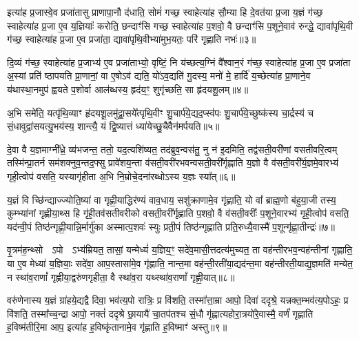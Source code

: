 इत्या॑ह प्र॒जास्वे॒व प्रजा॑तासु प्राणापा॒नौ द॑धाति॒ सोमं॑ गच्छ॒ स्वाहेत्या॑ह सौ॒म्या हि दे॒वत॑या प्र॒जा य॒ज्ञं ग॑च्छ॒ स्वाहेत्या॑ह प्र॒जा ए॒व य॒ज्ञियाः᳚ करोति॒ छन्दाꣳ॑सि गच्छ॒ स्वाहेत्या॑ह प॒शवो॒ वै छन्दाꣳ॑सि प॒शूने॒वाव॑ रुन्द्धे॒ द्यावा॑पृथि॒वी ग॑च्छ॒ स्वाहेत्या॑ह प्र॒जा ए॒व प्रजा॑ता॒ द्यावा॑पृथि॒वीभ्या॑मुभ॒यतः॒ परि॑ गृह्णाति नभः॑॥३॥

दि॒व्यं ग॑च्छ॒ स्वाहेत्या॑ह प्र॒जाभ्य॑ ए॒व प्रजा॑ताभ्यो॒ वृष्टिं॒ नि य॑च्छत्य॒ग्निं वै᳚श्वान॒रं ग॑च्छ॒ स्वाहेत्या॑ह प्र॒जा ए॒व प्रजा॑ता अ॒स्यां प्रति॑ ष्ठापयति प्रा॒णानां॒ वा ए॒षो\-ऽव॑ द्यति॒ यो॑\-ऽव॒द्यति॑ गु॒दस्य॒ मनो॑ मे॒ हार्दि॑ य॒च्छेत्या॑ह प्रा॒णाने॒व य॑थास्था॒नमुप॑ ह्वयते प॒शोर्वा आल॑ब्धस्य॒ हृद॑य॒ꣳ॒ शुगृ॑च्छति॒ सा हृ॑दयशू॒लम्॥४॥

अ॒भि समे॑ति॒ यत्पृ॑थि॒व्याꣳ हृ॑दयशू॒लमु॑द्वा॒सये᳚त्पृथि॒वीꣳ शु॒चार्प॑ये॒द्यद॒प्स्व॑पः शु॒चार्प॑ये॒च्छुष्क॑स्य चा॒र्द्रस्य॑ च सं॒धावुद्वा॑सयत्यु॒भय॑स्य॒ शान्त्यै॒ यं द्वि॒ष्यात्तं ध्या॑येच्छु॒चैवैन॑मर्पयति॥५॥

{\anuvakamend[{रेतो॑ मि॒त्रावरु॑णौ गच्छ॒ स्वाहा॒ नभो॑ हृदयशू॒लन्द्वात्रिꣳ॑शच्च॥१॥}]}

दे॒वा वै य॒ज्ञमाग्नी᳚ध्रे॒ व्य॑भजन्त॒ ततो॒ यद॒त्यशि॑ष्यत॒ तद॑ब्रुव॒न्वस॑तु॒ नु न॑ इ॒दमिति॒ तद्व॑सती॒वरी॑णां वसतीवरि॒त्वम् तस्मि॑न्प्रा॒तर्न सम॑शक्नुव॒न्तद॒फ्सु प्रावे॑शय॒न्ता व॑सती॒वरी॑रभवन्वसती॒वरी᳚र्गृह्णाति य॒ज्ञो वै व॑सती॒वरी᳚र्य॒ज्ञमे॒वारभ्य॑ गृही॒त्वोप॑ वसति॒ यस्यागृ॑हीता अ॒भि नि॒म्रोचे॒दना॑रब्धो\-ऽस्य य॒ज्ञः स्या᳚त्॥६॥

य॒ज्ञं वि च्छि॑न्द्याज्ज्योति॒ष्या॑ वा गृह्णी॒याद्धिर॑ण्यं वाव॒धाय॒ सशु॑क्राणामे॒व गृ॑ह्णाति॒ यो वा᳚ ब्राह्म॒णो ब॑हुया॒जी तस्य॒ कुम्भ्या॑नां गृह्णीया॒थ्स हि गृ॑ही॒तव॑सतीवरीको वसती॒वरी᳚र्गृह्णाति प॒शवो॒ वै व॑सती॒वरीः᳚ प॒शूने॒वारभ्य॑ गृही॒त्वोप॑ वसति॒ यद॑न्वी॒पं तिष्ठ॑न्गृह्णी॒यान्नि॒र्मार्गु॑का अस्मात्प॒शवः॑ स्युः प्रती॒पं तिष्ठ॑न्गृह्णाति प्रति॒रुध्यै॒वास्मै॑ प॒शून्गृ॑ह्णा॒तीन्द्रः॑॥७॥

वृ॒त्रम॑ह॒न्थ्सो  \-ऽपो  \-ऽभ्य॑म्रियत॒ तासां॒ यन्मेध्यं॑ य॒ज्ञिय॒ꣳ॒ सदे॑व॒मासी॒त्तदत्य॑मुच्यत॒ ता वह॑न्तीरभव॒न्वह॑न्तीनां गृह्णाति॒ या ए॒व मेध्या॑ य॒ज्ञियाः॒ सदे॑वा॒ आप॒स्तासा॑मे॒व गृ॑ह्णाति॒ नान्त॒मा वह॑न्ती॒रती॑या॒द्यद॑न्त॒मा वह॑न्तीरती॒याद्य॒ज्ञमति॑ मन्येत॒ न स्था॑व॒राणां᳚ गृह्णीया॒द्वरु॑णगृहीता॒ वै स्था॑व॒रा यथ्स्था॑व॒राणां᳚ गृह्णी॒यात्॥८॥

वरु॑णेनास्य य॒ज्ञं ग्रा॑हये॒द्यद्वै दिवा॒ भव॑त्य॒पो रात्रिः॒ प्र वि॑शति॒ तस्मा᳚त्ता॒म्रा आपो॒ दिवा॑ ददृश्रे॒ यन्नक्त॒म्भव॑त्य॒पो\-ऽहः॒ प्र वि॑शति॒ तस्मा᳚च्च॒न्द्रा आपो॒ नक्तं॑ ददृश्रे छा॒यायै॑ चा॒तप॑तश्च सं॒धौ गृ॑ह्णात्यहोरा॒त्रयो॑रे॒वास्मै॒ वर्णं॑ गृह्णाति ह॒विष्म॑तीरि॒मा आप॒ इत्या॑ह ह॒विष्कृ॑तानामे॒व गृ॑ह्णाति ह॒विष्माꣳ॑ अस्तु॥९॥

